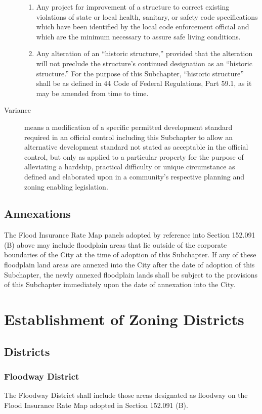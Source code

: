 \begin{description}
\begin{enumerate}[{\indent}a)]
            \item Any project for improvement of a structure to correct existing violations of state or local health, sanitary, or safety code specifications which have been identified by the local code enforcement official and which are the minimum necessary to assure safe living conditions.
            \item Any alteration of an “historic structure,” provided that the alteration will not preclude the structure's continued designation as an “historic structure.” For the purpose of this Subchapter, “historic structure” shall be as defined in 44 Code of Federal Regulations, Part 59.1, as it may be amended from time to time.
        \end{enumerate}
    \item[Variance] means a modification of a specific permitted development standard required in an official control including this Subchapter to allow an alternative development standard not stated as acceptable in the official control, but only as applied to a particular property for the purpose of alleviating a hardship, practical difficulty or unique circumstance as defined and elaborated upon in a community's respective planning and zoning enabling legislation.
\end{description}
\subsection{Annexations}
The Flood Insurance Rate Map panels adopted by reference into Section 152.091 (B) above may include floodplain areas that lie outside of the corporate boundaries of the City at the time of adoption of this Subchapter. If any of these floodplain land areas are annexed into the City after the date of adoption of this Subchapter, the newly annexed floodplain lands shall be subject to the provisions of this Subchapter immediately upon the date of annexation into the City.

\section{Establishment of Zoning Districts}
\subsection{Districts}
\subsubsection{Floodway District}
The Floodway District shall include those areas designated as floodway on the Flood Insurance Rate Map adopted in Section 152.091 (B).
